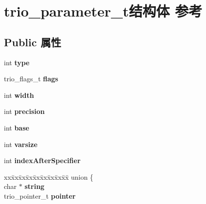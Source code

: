 \hypertarget{structtrio__parameter__t}{}\section{trio\+\_\+parameter\+\_\+t结构体 参考}
\label{structtrio__parameter__t}
\subsection*{Public 属性}
\begin{DoxyCompactItemize}
\item 
\mbox{\label{structtrio__parameter__t_a0bd1d484a7517a007db758b2da809fcc}} 
int {\bfseries type}
\item 
\mbox{\label{structtrio__parameter__t_a1ed1dacd8b1362518d6d9c42e9afb7a7}} 
trio\+\_\+flags\+\_\+t {\bfseries flags}
\item 
\mbox{\label{structtrio__parameter__t_aa9dd157fa2b64faa3e52ad81f108cdb8}} 
int {\bfseries width}
\item 
\mbox{\label{structtrio__parameter__t_a2e8177d06579a30d68a375118847e3f5}} 
int {\bfseries precision}
\item 
\mbox{\label{structtrio__parameter__t_a789fdbf1137a74f330f7e10f1b133c88}} 
int {\bfseries base}
\item 
\mbox{\label{structtrio__parameter__t_af284ba7dbd63df92a6bb898cd8547a76}} 
int {\bfseries varsize}
\item 
\mbox{\label{structtrio__parameter__t_a0c4a3dae99fef2686f951b5b368f2b7f}} 
int {\bfseries index\+After\+Specifier}
\item 
\mbox{\label{structtrio__parameter__t_af395a19359bea6fb6b63818267a7a123}} 
\begin{tabbing}
xx\=xx\=xx\=xx\=xx\=xx\=xx\=xx\=xx\=\kill
union \{\\
\>char $\ast$ {\bfseries string}\\
\>trio\_pointer\_t {\bfseries pointer}\\

\end{tabbing}
\end{DoxyCompactItemize}
